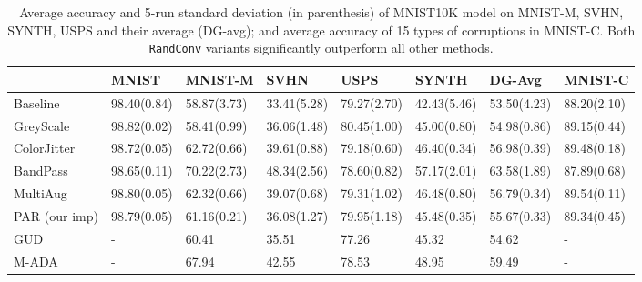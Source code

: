 \documentclass{article} \usepackage{iclr2021_conference,times}
\newcommand{\RandConv}{\texttt{RandConv}}
\begin{document}
\begin{table}[th]
\small
	\setlength{\tabcolsep}{4pt}
	\caption{Average accuracy and 5-run standard deviation (in parenthesis) of MNIST10K model on MNIST-M, SVHN, SYNTH, USPS and their average (DG-avg); and average accuracy of 15 types of corruptions in MNIST-C. Both {\RandConv} variants significantly outperform all other methods.}
	\label{table:digits_compare}
	\centering
	\begin{tabular}{l|l|lllll|l}
		\toprule
		& MNIST   & MNIST-M    & SVHN        & USPS        & SYNTH       & DG-Avg         & MNIST-C     \\
		\midrule
		Baseline    & 98.40\tiny(0.84) & 58.87\tiny(3.73) & 33.41\tiny(5.28) & 79.27\tiny(2.70) & 42.43\tiny(5.46) & 53.50\tiny(4.23) & 88.20\tiny(2.10) \\
		
		GreyScale   & 98.82\tiny(0.02) & 58.41\tiny(0.99)          & 36.06\tiny(1.48)          & 80.45\tiny(1.00)          & 45.00\tiny(0.80)          & 54.98\tiny(0.86)          & 89.15\tiny(0.44)          \\
		
		ColorJitter   & 98.72\tiny(0.05) & 62.72\tiny(0.66)          & 39.61\tiny(0.88)          & 79.18\tiny(0.60)          & 46.40\tiny(0.34)          & 56.98\tiny(0.39)          & 89.48\tiny(0.18)          \\
		
		{BandPass} & 98.65\tiny(0.11) &70.22\tiny(2.73) &	48.34\tiny(2.56)	& 78.60\tiny(0.82) &	57.17\tiny(2.01) &	63.58\tiny(1.89)	& 87.89\tiny(0.68) \\
		
		{MultiAug} & 98.80\tiny(0.05)	&62.32\tiny(0.66)	& 39.07\tiny(0.68)	&79.31\tiny(1.02)	 &46.48\tiny(0.80)&	56.79\tiny(0.34)	& 89.54\tiny(0.11) \\
		
		PAR (our imp)       & 98.79\tiny(0.05) & 61.16\tiny(0.21) & 36.08\tiny(1.27) & 79.95\tiny(1.18) & 45.48\tiny(0.35) & 55.67\tiny(0.33) & 89.34\tiny(0.45) \\

		
		GUD         & -           & 60.41       & 35.51       & 77.26       & 45.32       & 54.62       & -           \\
		M-ADA       & -           & 67.94       & 42.55       & 78.53       & 48.95       & 59.49       & -           \\
		\midrule


\end{tabular}
\end{table}
\end{document}
